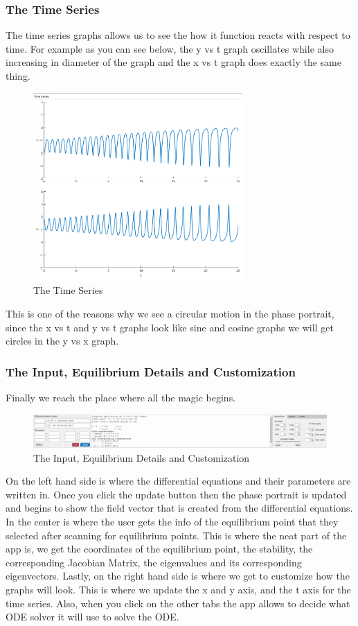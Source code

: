 \documentclass[a4paper,10pt]{article}
\begin{document}
\subsubsection{The Time Series}
The time series graphs allows us to see the how it function reacts with respect to time. For example as you can see below, the y vs t graph oscillates while also increasing in diameter of the graph and the x vs t graph does exactly the same thing. 
\begin{figure}[H]
	\centering
	\includegraphics[width = 8cm]{Project_App_2.png}
	\caption{The Time Series}
\end{figure}
This is one of the reasons why we see a circular motion in the phase portrait, since the x vs t and y vs t graphs look like sine and cosine graphs we will get circles in the y vs x graph. 
\subsubsection{The Input, Equilibrium Details and Customization}
Finally we reach the place where all the magic begins.
\begin{figure}[H]
	\centering
	\includegraphics[width = 16cm]{Project_App_3.png}
	\caption{The Input, Equilibrium Details and Customization}
\end{figure}
On the left hand side is where the differential equations and their parameters are written in. Once you click the update button then the phase portrait is updated and begins to show the field vector that is created from the differential equations. In the center is where the user gets the info of the equilibrium point that they selected after scanning for equilibrium points. This is where the neat part of the app is, we get the coordinates of the equilibrium point, the stability, the corresponding Jacobian Matrix, the eigenvalues and its corresponding eigenvectors. Lastly, on the right hand side is where we get to customize how the graphs will look. This is where we update the x and y axis, and the t axis for the time series. Also, when you click on the other tabs the app allows to decide what ODE solver it will use to solve the ODE. 
\end{document}
